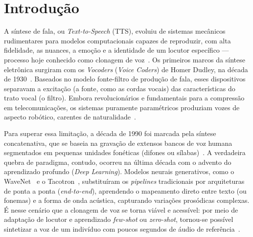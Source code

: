 \documentclass[12pt,a4paper]{article}
\begin{document}
\newpage
\tableofcontents
\newpage
{}
\hypersetup{pageanchor=true}
\section{Introdução}
\label{sec:introducao}

A síntese de fala, ou \textit{Text-to-Speech} (TTS), evoluiu de sistemas
mecânicos rudimentares para modelos computacionais capazes de reproduzir, com
alta fidelidade, as nuances, a emoção e a identidade de um locutor específico
--- processo hoje conhecido como clonagem de voz~\cite{jia2018}. Os primeiros
marcos da síntese eletrônica surgiram com os \textit{Vocoders} (\textit{Voice
	Coders}) de Homer Dudley, na década de 1930~\cite{dudley1939}. Baseados no modelo
fonte-filtro de produção de fala, esses dispositivos separavam a excitação (a
fonte, como as cordas vocais) das características do trato vocal (o filtro).
Embora revolucionários e fundamentais para a compressão em telecomunicações, os
sistemas puramente paramétricos produziam vozes de aspecto robótico, carentes de
naturalidade~\cite{klatt1987}.

Para superar essa limitação, a década de 1990 foi marcada pela síntese
concatenativa, que se baseia na gravação de extensos bancos de voz humana
segmentados em pequenas unidades fonéticas (difones ou sílabas)~\cite{hunt1996}. A verdadeira quebra de paradigma, contudo, ocorreu na última
década com o advento do aprendizado profundo (\textit{Deep Learning}). Modelos
neurais generativos, como o WaveNet~\cite{oord2016wavenet} e o Tacotron~\cite{wang2017}, substituíram os \textit{pipelines} tradicionais por
arquiteturas de ponta a ponta (\textit{end-to-end}), aprendendo o mapeamento
direto entre texto (ou fonemas) e a forma de onda acústica, capturando variações
prosódicas complexas. É nesse cenário que a clonagem de voz se torna viável e
acessível: por meio de adaptação de locutor e aprendizado \textit{few-shot} ou
\textit{zero-shot}, tornou-se possível sintetizar a voz de um indivíduo com
poucos segundos de áudio de referência~\cite{jia2018, wang2023vall}.
\end{document}
